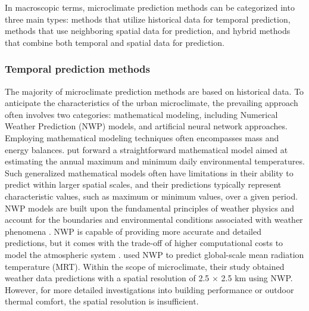 \documentclass[a4paper,fleqn]{cas-sc}
\begin{document}
In macroscopic terms, microclimate prediction methods can be categorized into three main types: methods that utilize historical data for temporal prediction, methods that use neighboring spatial data for prediction, and hybrid methods that combine both temporal and spatial data for prediction.

\subsubsection{Temporal prediction methods}

The majority of microclimate prediction methods are based on historical data. To anticipate the characteristics of the urban microclimate, the prevailing approach often involves two categories: mathematical modeling, including Numerical Weather Prediction (NWP) models, and artificial neural network approaches. Employing mathematical modeling techniques often encompasses mass and energy balances. \cite{quemada2021simple} put forward a straightforward mathematical model aimed at estimating the annual maximum and minimum daily environmental temperatures. Such generalized mathematical models often have limitations in their ability to predict within larger spatial scales, and their predictions typically represent characteristic values, such as maximum or minimum values, over a given period. NWP models are built upon the fundamental principles of weather physics and account for the boundaries and environmental conditions associated with weather phenomena \citep{mathiesen2011evaluation}. NWP is capable of providing more accurate and detailed predictions, but it comes with the trade-off of higher computational costs to model the atmospheric system \citep{aggarwal2013comprehensive}. \cite{di2020mean} used NWP to predict global-scale mean radiation temperature (MRT). Within the scope of microclimate, their study obtained weather data predictions with a spatial resolution of 2.5 $\times$ 2.5 km using NWP.  However, for more detailed investigations into building performance or outdoor thermal comfort, the spatial resolution is insufficient. 
\end{document}
